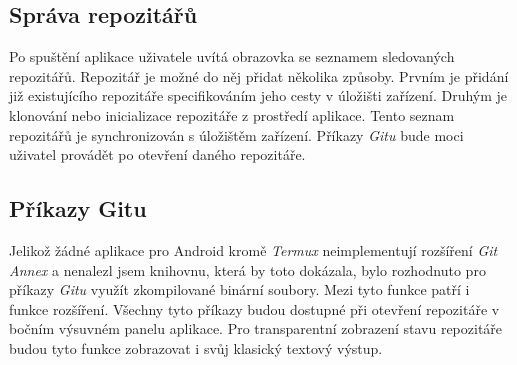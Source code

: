     \subsection{Správa repozitářů}
    Po spuštění aplikace uživatele uvítá obrazovka se seznamem sledovaných repozitářů. Repozitář je možné do něj přidat několika způsoby. Prvním je přidání již existujícího repozitáře specifikováním jeho cesty v úložišti zařízení. Druhým je klonování nebo inicializace repozitáře z prostředí aplikace. Tento seznam repozitářů je synchronizován s úložištěm zařízení. Příkazy \emph{Gitu} bude moci uživatel provádět po otevření daného repozitáře.

    \newpage
    \subsection{Příkazy Gitu}
    Jelikož žádné aplikace pro Android kromě \emph{Termux} neimplementují rozšíření \emph{Git Annex} a nenalezl jsem knihovnu, která by toto dokázala, bylo rozhodnuto pro příkazy \emph{Gitu} využít zkompilované binární soubory. Mezi tyto funkce patří i funkce rozšíření. Všechny tyto příkazy budou dostupné při otevření repozitáře v bočním výsuvném panelu aplikace. Pro transparentní zobrazení stavu repozitáře budou tyto funkce zobrazovat i svůj klasický textový výstup.

